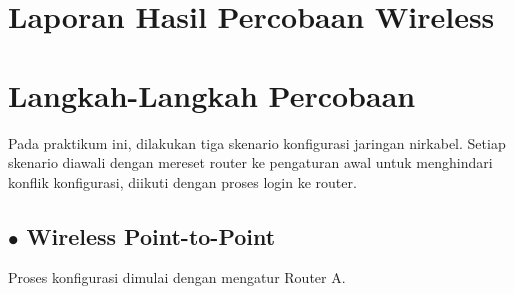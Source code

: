 \section*{Laporan Hasil Percobaan Wireless} %

\section{Langkah-Langkah Percobaan}
Pada praktikum ini, dilakukan tiga skenario konfigurasi jaringan nirkabel. Setiap skenario diawali dengan mereset router ke pengaturan awal untuk menghindari konflik konfigurasi, diikuti dengan proses login ke router.

\subsection*{$\bullet$ Wireless Point-to-Point}
Proses konfigurasi dimulai dengan mengatur Router A.
